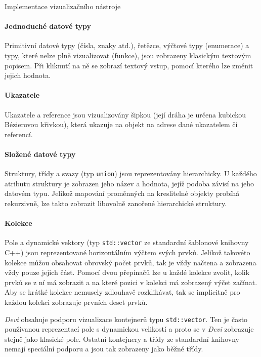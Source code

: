 \documentclass[czech,bachelor,male,python,dept460,hidelinks]{diploma}						%
\newcommand{\parspace}[1][]{
	\ifthenelse{\isempty{#1}}{\vspace{5mm}}{\vspace{#1}}
	\par
}
\begin{document}
\begin{section}{Implementace vizualizačního nástroje}
	
	\paragraph*{Jednoduché datové typy} Primitivní datové typy (čísla, znaky atd.), řetězce, výčtové typy (enumerace) a typy, které nelze plně vizualizovat
	(funkce), jsou zobrazeny klasickým textovým popisem. Při kliknutí na ně se zobrazí textový vstup, pomocí kterého lze změnit jejich hodnota.
	\paragraph*{Ukazatele} Ukazatele a reference jsou vizualizovány šipkou (její dráha je určena kubickou Bézierovou křivkou), která ukazuje na objekt na adrese
	dané ukazatelem či referencí. %
	\paragraph*{Složené datové typy} Struktury, třídy a svazy (typ \texttt{union}) jsou reprezentovány hierarchicky. U každého atributu struktury je zobrazen jeho
	název a hodnota, jejíž podoba závisí na jeho datovém typu. Jelikož mapování proměnných na kreslitelné objekty probíhá rekurzivně, lze takto zobrazit
	libovolně zanořené hierarchické struktury.
	\paragraph*{Kolekce} Pole a dynamické vektory (typ \texttt{std::vector} ze standardní šablonové knihovny C++) jsou reprezentované horizontálním výčtem svých prvků.
	Jelikož takovéto kolekce můžou obsahovat obrovský počet prvků, tak je vždy načtena a zobrazena vždy pouze jejich část. Pomocí dvou přepínačů lze u každé
	kolekce zvolit, kolik prvků se z ní má zobrazit a na které pozici v kolekci má zobrazený výčet začínat. Aby se krátké kolekce nemusely zdlouhavě rozklikávat,
	tak se implicitně pro každou kolekci zobrazuje prvních deset prvků.
	
	\parspace \textit{Devi} obsahuje podporu vizualizace kontejnerů typu \texttt{std::vector}. Ten je často používanou
	reprezentací pole s dynamickou velikostí a proto se v \textit{Devi} zobrazuje stejně jako klasické pole. Ostatní kontejnery a třídy ze standardní knihovny
	nemají speciální podporu a jsou tak zobrazeny jako běžné třídy.
	

\end{section}
\end{document}
